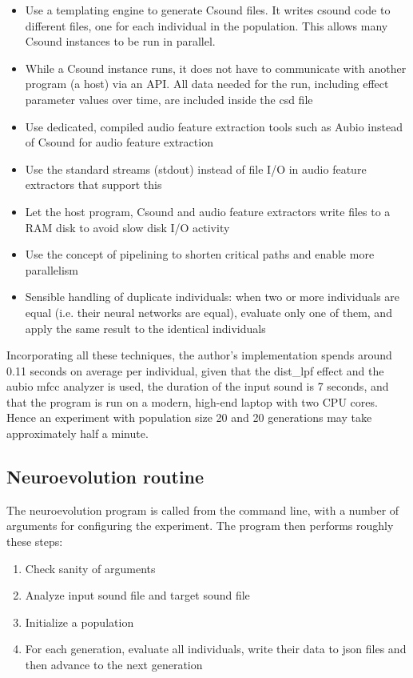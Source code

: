\begin{itemize}  
\item Use a templating engine to generate Csound files. It writes csound code to different files, one for each individual in the population. This allows many Csound instances to be run in parallel.
\item While a Csound instance runs, it does not have to communicate with another program (a host) via an API. All data needed for the run, including effect parameter values over time, are included inside the csd file
\item Use dedicated, compiled audio feature extraction tools such as Aubio instead of Csound for audio feature extraction
\item Use the standard streams (stdout) instead of file I/O in audio feature extractors that support this
\item Let the host program, Csound and audio feature extractors write files to a RAM disk to avoid slow disk I/O activity
\item Use the concept of pipelining to shorten critical paths and enable more parallelism
\item Sensible handling of duplicate individuals: when two or more individuals are equal (i.e. their neural networks are equal), evaluate only one of them, and apply the same result to the identical individuals
\end{itemize}

Incorporating all these techniques, the author's implementation spends around 0.11 seconds on average per individual, given that the dist\_lpf effect and the aubio mfcc analyzer is used, the duration of the input sound is 7 seconds, and that the program is run on a modern, high-end laptop with two CPU cores. Hence an experiment with population size 20 and 20 generations may take approximately half a minute.

\subsection{Neuroevolution routine}
The neuroevolution program is called from the command line, with a number of arguments for configuring the experiment. The program then performs roughly these steps:

\begin{enumerate}  
\item Check sanity of arguments
\item Analyze input sound file and target sound file
\item Initialize a population
\item For each generation, evaluate all individuals, write their data to json files and then advance to the next generation
\end{enumerate}

